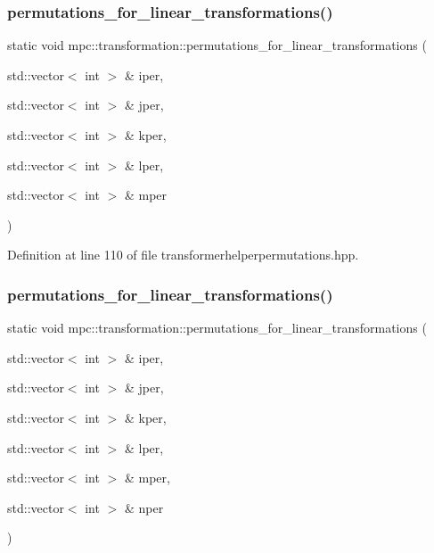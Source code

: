 \subsubsection{\texorpdfstring{permutations\+\_\+for\+\_\+linear\+\_\+transformations()}{permutations\_for\_linear\_transformations()}\hspace{0.1cm}{\footnotesize\ttfamily [5/11]}}
{\footnotesize\ttfamily static void mpc\+::transformation\+::permutations\+\_\+for\+\_\+linear\+\_\+transformations (\begin{DoxyParamCaption}\item[{std\+::vector$<$ int $>$ \&}]{iper,  }\item[{std\+::vector$<$ int $>$ \&}]{jper,  }\item[{std\+::vector$<$ int $>$ \&}]{kper,  }\item[{std\+::vector$<$ int $>$ \&}]{lper,  }\item[{std\+::vector$<$ int $>$ \&}]{mper }\end{DoxyParamCaption})\hspace{0.3cm}{\ttfamily [static]}}



Definition at line 110 of file transformerhelperpermutations.\+hpp.

\mbox{\label{namespacempc_1_1transformation_a36b74334064f0321f1c82125af19e793}} 
\subsubsection{\texorpdfstring{permutations\+\_\+for\+\_\+linear\+\_\+transformations()}{permutations\_for\_linear\_transformations()}\hspace{0.1cm}{\footnotesize\ttfamily [6/11]}}
{\footnotesize\ttfamily static void mpc\+::transformation\+::permutations\+\_\+for\+\_\+linear\+\_\+transformations (\begin{DoxyParamCaption}\item[{std\+::vector$<$ int $>$ \&}]{iper,  }\item[{std\+::vector$<$ int $>$ \&}]{jper,  }\item[{std\+::vector$<$ int $>$ \&}]{kper,  }\item[{std\+::vector$<$ int $>$ \&}]{lper,  }\item[{std\+::vector$<$ int $>$ \&}]{mper,  }\item[{std\+::vector$<$ int $>$ \&}]{nper }\end{DoxyParamCaption})\hspace{0.3cm}{\ttfamily [static]}}



